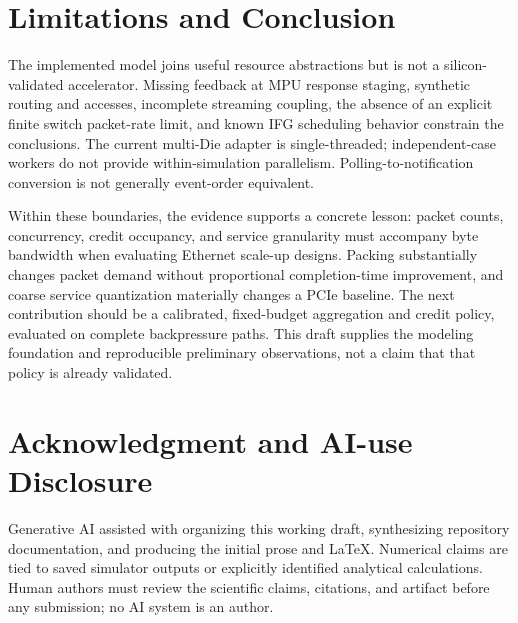 \documentclass[conference]{IEEEtran}
\begin{document}
\section{Limitations and Conclusion}
The implemented model joins useful resource abstractions but is not a silicon-validated accelerator. Missing feedback at MPU response staging, synthetic routing and accesses, incomplete streaming coupling, the absence of an explicit finite switch packet-rate limit, and known IFG scheduling behavior constrain the conclusions. The current multi-Die adapter is single-threaded; independent-case workers do not provide within-simulation parallelism. Polling-to-notification conversion is not generally event-order equivalent.

Within these boundaries, the evidence supports a concrete lesson: packet counts, concurrency, credit occupancy, and service granularity must accompany byte bandwidth when evaluating Ethernet scale-up designs. Packing substantially changes packet demand without proportional completion-time improvement, and coarse service quantization materially changes a PCIe baseline. The next contribution should be a calibrated, fixed-budget aggregation and credit policy, evaluated on complete backpressure paths. This draft supplies the modeling foundation and reproducible preliminary observations, not a claim that that policy is already validated.

\section*{Acknowledgment and AI-use Disclosure}
Generative AI assisted with organizing this working draft, synthesizing repository documentation, and producing the initial prose and LaTeX. Numerical claims are tied to saved simulator outputs or explicitly identified analytical calculations. Human authors must review the scientific claims, citations, and artifact before any submission; no AI system is an author.

\label{page:body-end}
\clearpage


\end{document}
